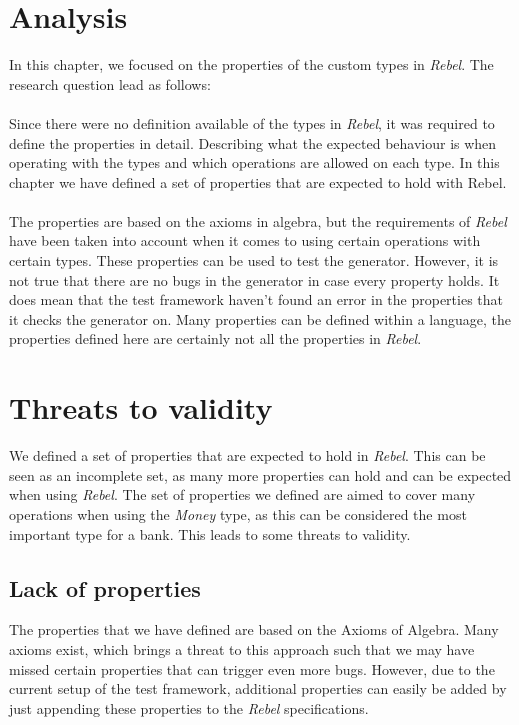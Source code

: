 \section{Analysis}
In this chapter, we focused on the properties of the custom types in \textit{Rebel}. The research question lead as follows:\rqOne\\
\\
Since there were no definition available of the types in \textit{Rebel}, it was required to define the properties in detail. Describing what the expected behaviour is when operating with the types and which operations are allowed on each type. In this chapter we have defined a set of properties that are expected to hold with Rebel.\\
\\
The properties are based on the axioms in algebra, but the requirements of \textit{Rebel} have been taken into account when it comes to using certain operations with certain types. These properties can be used to test the generator. However, it is not true that there are no bugs in the generator in case every property holds. It does mean that the test framework haven't found an error in the properties that it checks the generator on. Many properties can be defined within a language, the properties defined here are certainly not all the properties in \textit{Rebel}.

\section{Threats to validity}
We defined a set of properties that are expected to hold in \textit{Rebel}. This can be seen as an incomplete set, as many more properties can hold and can be expected when using \textit{Rebel}. The set of properties we defined are aimed to cover many operations when using the \textit{Money} type, as this can be considered the most important type for a bank. This leads to some threats to validity.

\subsection*{Lack of properties}
The properties that we have defined are based on the Axioms of Algebra. Many axioms exist, which brings a threat to this approach such that we may have missed certain properties that can trigger even more bugs. However, due to the current setup of the test framework, additional properties can easily be added by just appending these properties to the \textit{Rebel} specifications.


